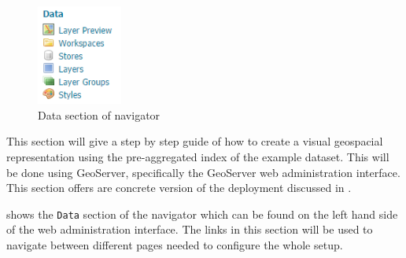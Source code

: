 \begin{figure}
	\centering
	  \vspace{-15pt}
	\includegraphics[width=0.25\textwidth]{Figures/Data.png}
	  \vspace{-10pt}
	\caption{\label{fig:data}Data section of navigator}
	  \vspace{-10pt}
\end{figure}
This section will give a step by step guide of how to create a visual geospacial representation using the pre-aggregated index of the example dataset. This will be done using GeoServer, specifically the GeoServer web administration interface. This section offers are concrete version of the deployment discussed in .

 shows the \lstinline|Data| section of the navigator which can be found on the left hand side of the web administration interface. The links in this section will be used to navigate between different pages needed to configure the whole setup.

